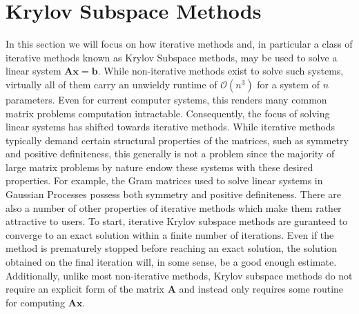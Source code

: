\section{Krylov Subspace Methods}\label{Chapter4}
In this section we will focus on how iterative methods and, in particular a class of iterative methods known as Krylov Subspace methods, may be used to solve a linear system $\bm{A} \bm{x} = \bm{b}$. While non-iterative methods exist to solve such systems, virtually all of them carry an unwieldy runtime of $\mathcal{O} \left( n^3 \right)$ for a system of $n$ parameters. Even for current computer systems, this renders many common matrix problems computation intractable. Consequently, the focus of solving linear systems has shifted towards iterative methods. While iterative methods typically demand certain structural properties of the matrices, such as symmetry and positive definiteness, this generally is not a problem since the majority of large matrix problems by nature endow these systems with these desired properties. For example, the Gram matrices used to solve linear systems in Gaussian Processes possess both symmetry and positive definiteness. There are also a number of other properties of iterative methods which make them rather attractive to users. To start, iterative Krylov subspace methods are guranteed to converge to an exact solution within a finite number of iterations. Even if the method is prematurely stopped before reaching an exact solution, the solution obtained on the final iteration will, in some sense, be a good enough estimate. Additionally, unlike most non-iterative methods, Krylov subspace methods do not require an explicit form of the matrix $\bm{A}$ and instead only requires some routine for computing $\bm{A} \bm{x}$.











